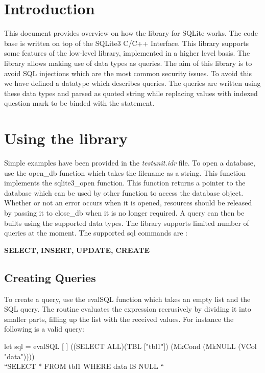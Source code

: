 \documentclass[11pt]{article}
\begin{document}
         
 \section{Introduction}
\label{Introduction} 
This document provides overview on how the library for SQLite works. The code base is written on top of the
SQLite3 C/C++ Interface.
This library supports some features of the low-level library, implemented in a higher level basis.
The library allows making use of data types as queries. The aim of this library is to avoid
SQL injections which are the most common security issues.
To avoid this we have defined a datatype which describes queries.
The queries are written using these data types and parsed as quoted string
while replacing values with indexed question mark to be binded with the statement.
\section{Using the library}
\label{Using the library}
Simple examples have been provided in the \emph{testunit.idr} file.
To open a database, use the open\_db function which takes the filename as a string. 
This function implements the sqlite3\_open function.
This function returns a pointer to the database which can be used by other function
to access the database object.
Whether or not an error occurs when it is opened,
resources should be released by passing it to close\_db when it is no longer required.
A query can then be builts using the supported data types.
The library supports limited number of queries at the moment. The supported sql commands are :
\newline

\textbf{SELECT,}
\textbf{INSERT,}
\textbf{UPDATE,}
\textbf{CREATE}

\subsection{Creating Queries}
\label{Creating Queries}

To create a query, use the evalSQL function which takes an empty list and the SQL query.
The routine evaluates the expression recrusively by dividing it into smaller parts,
filling up the list with the received values. For instance the following is a valid query:

let sql = evalSQL [ ] ((SELECT ALL)(TBL ["tbl1"]) (MkCond (MkNULL (VCol "data"))))
\newline
{}
\\“SELECT * FROM tbl1 WHERE data IS NULL “
\end{document}
